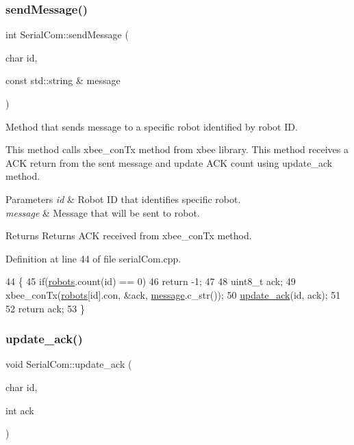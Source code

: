 \subsubsection{\texorpdfstring{send\+Message()}{sendMessage()}}
{\footnotesize\ttfamily int Serial\+Com\+::send\+Message (\begin{DoxyParamCaption}\item[{char}]{id,  }\item[{const std\+::string \&}]{message }\end{DoxyParamCaption})}

Method that sends message to a specific robot identified by robot ID.

This method calls xbee\+\_\+con\+Tx method from xbee library. This method receives a A\+CK return from the sent message and update A\+CK count using update\+\_\+ack method.


\begin{DoxyParams}{Parameters}
{\em id} & Robot ID that identifies specific robot. \\
\hline
{\em message} & Message that will be sent to robot. \\
\hline
\end{DoxyParams}
\begin{DoxyReturn}{Returns}
Returns A\+CK received from xbee\+\_\+con\+Tx method. 
\end{DoxyReturn}


Definition at line 44 of file serial\+Com.\+cpp.


\begin{DoxyCode}
44                                                          \{
45     \textcolor{keywordflow}{if}(\hyperlink{class_serial_com_ae20f6fe8f53cb581b285924eda5ad01c}{robots}.count(\textcolor{keywordtype}{id}) == 0)
46         \textcolor{keywordflow}{return} -1;
47 
48     uint8\_t ack;
49     xbee\_conTx(\hyperlink{class_serial_com_ae20f6fe8f53cb581b285924eda5ad01c}{robots}[\textcolor{keywordtype}{id}].con, &ack, \hyperlink{structmessage}{message}.c\_str());
50     \hyperlink{class_serial_com_af5ec587c5ade11ed2b68366ad4b79df2}{update\_ack}(\textcolor{keywordtype}{id}, ack);
51 
52     \textcolor{keywordflow}{return} ack;
53 \}
\end{DoxyCode}
\mbox{\label{class_serial_com_af5ec587c5ade11ed2b68366ad4b79df2}} 
\subsubsection{\texorpdfstring{update\+\_\+ack()}{update\_ack()}}
{\footnotesize\ttfamily void Serial\+Com\+::update\+\_\+ack (\begin{DoxyParamCaption}\item[{char}]{id,  }\item[{int}]{ack }\end{DoxyParamCaption})}



